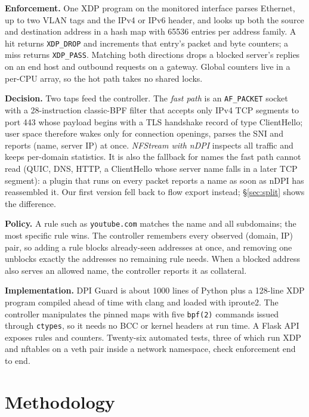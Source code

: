 \documentclass[sigconf,nonacm]{acmart}
\newcommand{\sys}{DPI Guard}
\begin{document}
\textbf{Enforcement.} One XDP program on the monitored interface parses Ethernet, up to two
VLAN tags and the IPv4 or IPv6 header, and looks up both the source and destination address in
a hash map with \num{65536} entries per address family. A hit returns \texttt{XDP\_DROP} and
increments that entry's packet and byte counters; a miss returns \texttt{XDP\_PASS}. Matching
both directions drops a blocked server's replies on an end host and outbound requests on a
gateway. Global counters live in a per-CPU array, so the hot path takes no shared locks.

\textbf{Decision.} Two taps feed the controller. The \emph{fast path} is an \texttt{AF\_PACKET}
socket with a 28-instruction classic-BPF filter that accepts only IPv4 TCP segments to port 443
whose payload begins with a TLS handshake record of type ClientHello; user space therefore
wakes only for connection openings, parses the SNI and reports (name, server IP) at once.
\emph{NFStream with nDPI} inspects all traffic and keeps per-domain statistics. It is also the
fallback for names the fast path cannot read (QUIC, DNS, HTTP, a ClientHello whose server name
falls in a later TCP segment): a plugin that runs on every packet reports a name as soon as nDPI
has reassembled it. Our first version fell back to flow export instead; \S\ref{sec:split}
shows the difference.

\textbf{Policy.} A rule such as \texttt{youtube.com} matches the name and all subdomains; the
most specific rule wins. The controller remembers every observed (domain, IP) pair, so adding a
rule blocks already-seen addresses at once, and removing one unblocks exactly the addresses no
remaining rule needs. When a blocked address also serves an allowed name, the controller
reports it as collateral.

\textbf{Implementation.} \sys{} is about \num{1000} lines of Python plus a 128-line XDP program
compiled ahead of time with clang and loaded with iproute2. The controller manipulates the
pinned maps with five \texttt{bpf(2)} commands issued through \texttt{ctypes}, so it needs no
BCC or kernel headers at run time. A Flask API exposes rules and counters. Twenty-six
automated tests, three of which run XDP and nftables on a veth pair inside a network namespace,
check enforcement end to end.

\section{Methodology}
\label{sec:method}
\end{document}
